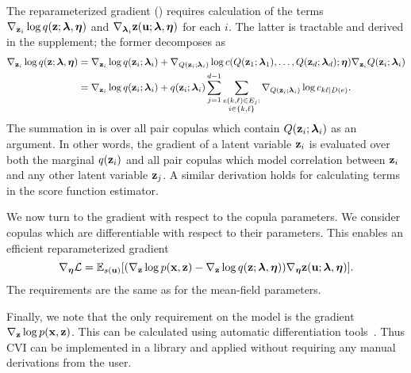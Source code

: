 The reparameterized gradient ()
requires calculation of the terms
$\nabla_{\boldsymbol{\mathbf{z}}_i}\log q(\boldsymbol{\mathbf{z}} ; \boldsymbol{\mathbf{\lambda}},\boldsymbol{\mathbf{\eta}})$ and
$\nabla_{\boldsymbol{\mathbf{\lambda}}_i}\boldsymbol{\mathbf{z}}(\boldsymbol{\mathbf{u}};\boldsymbol{\mathbf{\lambda}},\boldsymbol{\mathbf{\eta}})$ for each $i$. The latter is tractable and derived in the supplement; the former decomposes as
\begin{align}
  \nabla_{\mbz_i}\log q(\mbz; \mblambda, \mbeta)
                 &=
                   \nabla_{\mbz_i} \log q(\mbz_i; \mblambda_i) +
                   \nabla_{Q(\mbz_i;\mblambda_i)} \log c(Q(\mbz_1;\mblambda_1), \ldots, Q(\mbz_d; \mblambda_d); \mbeta)
                   \nabla_{\mbz_i} Q(\mbz_i;\mblambda_i)
                   \nonumber
  \\
                 &=
                   \nabla_{\mbz_i} \log q(\mbz_i; \mblambda_i)+
                   q(\mbz_i;\mblambda_i)
                   \sum_{j=1}^{d-1}\sum_{\substack{e(k,\ell)\in E_j:\\i\in
  \{k,\ell\}}}
  \nabla_{Q(\mbz_i;\mblambda_i)}
  \log c_{k\ell|D(e)}.
\label{eq:grad_meanfield:reparam}
\end{align}
The summation in  is over all pair
copulas which contain $Q(\boldsymbol{\mathbf{z}}_i ; \boldsymbol{\mathbf{\lambda}}_i)$ as an argument. In
other words, the gradient of a latent variable $\boldsymbol{\mathbf{z}}_i$ is evaluated
over both the marginal $q(\boldsymbol{\mathbf{z}}_i)$ and all pair copulas which model
correlation between $\boldsymbol{\mathbf{z}}_i$ and any other latent variable
$\boldsymbol{\mathbf{z}}_j$.
A similar derivation holds for calculating terms in the score function estimator.

We now turn to the gradient with respect to the copula parameters. We
consider copulas which are differentiable with respect to their
parameters. This enables an efficient reparameterized gradient
\begin{equation}
\nabla_{\mbeta}\mathcal{L} =
\mathbb{E}_{s(\mbu)}[(\nabla_{\mbz}\log
p(\mbx,\mbz)-\nabla_{\mbz}\log
q(\mbz;\mblambda,\mbeta))\nabla_{\mbeta}\mbz(\mbu;\mblambda,\mbeta)].
\label{eq:grad_copula}
\end{equation}
The requirements are the same as for the mean-field parameters.

Finally, we note that the only requirement on the model is the
gradient $\nabla_{\boldsymbol{\mathbf{z}}}\log p(\boldsymbol{\mathbf{x}},\boldsymbol{\mathbf{z}})$. This can be calculated
using automatic differentiation tools~\citep{stan-software:2015}. Thus \Gls{CVI} can be implemented in a library
and applied without requiring any manual derivations from the user.

